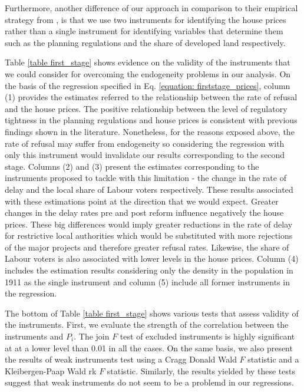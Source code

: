 \documentclass[12pt,letterpaper]{article}
\begin{document}
Furthermore, another difference of our approach in comparison to their empirical strategy from \citet{hilber2016supply}, is that we use two instruments for 
identifying the house prices rather than a single instrument for identifying variables that determine them such as the 
planning regulations and the share of developed land respectively.

Table \ref{table first_stage} shows evidence on the validity of the instruments that we could consider for overcoming 
the endogeneity problems in our analysis. On the basis of the regression
specified in Eq. \ref{equation: firststage_prices}, column (1)
provides the estimates referred to the relationship between the rate of refusal and the 
house prices. The positive relationship between the level of regulatory tightness in the planning 
regulations and house prices is consistent with previous findings shown in the literature. Nonetheless,
 for the reasons exposed above, the 
rate of refusal may suffer from endogeneity so considering the regression with only this instrument
 would invalidate our results corresponding
to the second stage. Columns (2) and (3) present the estimates 
corresponding to the instruments proposed to tackle with this limitation - the 
change in the rate of delay and the local share of Labour voters respectively. 
These results associated with these estimations point at the direction that we would expect. Greater changes
 in the delay rates pre and
 post reform influence negatively the house prices. These big differences would imply 
 greater reductions in the rate of delay for restrictive local authorities which would be substituted with more
  rejections of the major projects and therefore 
  greater refusal rates. Likewise, the share of Labour voters is also associated with lower levels in the house prices. 
Column (4)
includes the estimation results considering only the density in the 
population in 1911 as the single instrument and column (5) include all
former instruments in the regression. 

  {}


The bottom of Table \ref{table first_stage} shows various tests that assess validity of the instruments. First, we 
evaluate the strength of the correlation between the instruments and $P_{i}$. The join $F$ test of excluded instruments is highly significant at
at a lower level than 0.01 in all the cases. On the same basis, we also present the results of 
weak instruments test using a Cragg Donald Wald $F$ statistic and a 
Kleibergen-Paap Wald rk $F$ statistic. Similarly, the results yielded by these tests suggest
that weak instruments do not seem to be a problemd in our regressions.
\end{document}
